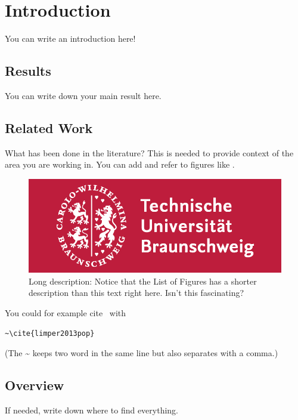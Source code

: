 \chapter{Introduction}

You can write an introduction here!

\section{Results}
You can write down your main result here.

\section{Related Work}
What has been done in the literature? This is needed to provide context of the area you are working in.
You can add and refer to figures like . 

\begin{figure}
	\centering
	\includegraphics[]{./figures/tu-bs_logo.jpg}
	\caption[Short description]{Long description: Notice that the List of Figures has a shorter description than this text right here. Isn't this fascinating?}
	\label{fig:logo}
\end{figure}

You could for example cite~\cite{limper2013pop} with \begin{verbatim}
~\cite{limper2013pop}
\end{verbatim}
(The \~{} keeps two word in the same line but also separates with a comma.)

\section{Overview}
If needed, write down where to find everything.